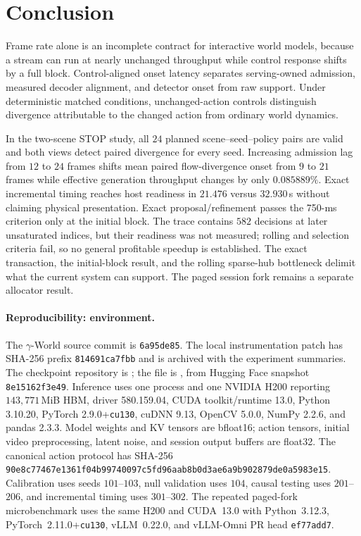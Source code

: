\documentclass[11pt]{article}
\begin{document}
\section{Conclusion}
\label{sec:conclusion}

Frame rate alone is an incomplete contract for interactive world models, because a stream can run at nearly unchanged throughput while control response shifts by a full block. Control-aligned onset latency separates serving-owned admission, measured decoder alignment, and detector onset from raw support. Under deterministic matched conditions, unchanged-action controls distinguish divergence attributable to the changed action from ordinary world dynamics.

In the two-scene STOP study, all $24$ planned scene--seed--policy pairs are valid and both views detect paired divergence for every seed. Increasing admission lag from $12$ to $24$ frames shifts mean paired flow-divergence onset from $9$ to $21$ frames while effective generation throughput changes by only $0.085889\%$. Exact incremental timing reaches host readiness in $21.476$ versus $32.930$\,s without claiming physical presentation. Exact proposal/refinement passes the 750-ms criterion only at the initial block. The trace contains $582$ decisions at later unsaturated indices, but their readiness was not measured; rolling and selection criteria fail, so no general profitable speedup is established. The exact transaction, the initial-block result, and the rolling sparse-hub bottleneck delimit what the current system can support. The paged session fork remains a separate allocator result.

\paragraph{Reproducibility: environment.}
The $\gamma$-World source commit is \texttt{6a95de85}. The local instrumentation patch has SHA-256 prefix \texttt{814691ca7fbb} and is archived with the experiment summaries. The checkpoint repository is ; the file is , from Hugging Face snapshot \texttt{8e15162f3e49}. Inference uses one process and one NVIDIA H200 reporting $143{,}771$\,MiB HBM, driver 580.159.04, CUDA toolkit/runtime 13.0, Python 3.10.20, PyTorch 2.9.0+\texttt{cu130}, cuDNN 9.13, OpenCV 5.0.0, NumPy 2.2.6, and pandas 2.3.3. Model weights and KV tensors are bfloat16; action tensors, initial video preprocessing, latent noise, and session output buffers are float32. The canonical action protocol has SHA-256 \texttt{90e8c77467e1361f0}\allowbreak\texttt{4b99740097c5fd96}\allowbreak\texttt{aab8b0d3ae6a9b90}\allowbreak\texttt{2879de0a5983e15}. Calibration uses seeds $101$--$103$, null validation uses $104$, causal testing uses $201$--$206$, and incremental timing uses $301$--$302$. The repeated paged-fork microbenchmark uses the same H200 and CUDA~13.0 with Python~3.12.3, PyTorch~2.11.0+\texttt{cu130}, vLLM~0.22.0, and vLLM-Omni PR head \texttt{ef77add7}.
\end{document}
